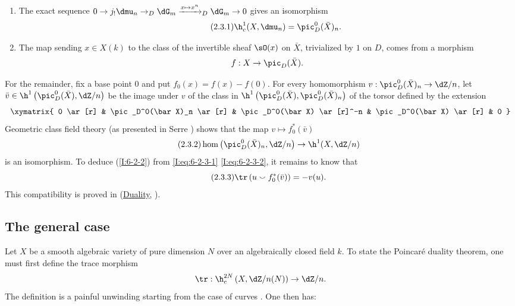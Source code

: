 \begin{enumerate}[\indent a)]
  \item {}The exact sequence
    $0\to j_!\dmu_n\to_D\dG_m\xrightarrow{x\mapsto x^n}_D\dG_m\to0$ gives an
    isomorphism
    \begin{equation*}\tag{2.3.1}\label{I:eq:6-2-3-1}
      \h_c^1(X,\dmu_n) = \pic_D^0(\bar X)_n \text{.}
    \end{equation*}
  \item The map sending $x\in X(k)$ to the class of the invertible sheaf
    $\sO(x)$ on $\bar X$, trivialized by $1$ on $D$, comes from a
    morphism
    \[
      f:X \to \pic_D(\bar X) \text{.}
    \]
\end{enumerate}
For the remainder, fix a base point $0$ and put
$f_0(x)=f(x)-f(0)$. For every homomorphism
$v:\pic_D^0(\bar X)_n\to\dZ/n$, let
$\bar v\in\h^1\left(\pic_D^0(\bar X),\dZ/n\right)$ be the image under
$v$ of the class in
$\h^1\left(\pic_D^0(\bar X),\pic_D^0(\bar X)_n\right)$ of the torsor
defined by the extension
\[\xymatrix{
  0 \ar[r]
    & \pic_D^0(\bar X)_n \ar[r]
    & \pic_D^0(\bar X) \ar[r]^-n
    & \pic_D^0(\bar X) \ar[r]
    & 0
}\]
Geometric class field theory (as presented in Serre \cite{se59}) shows
that the map $v\mapsto f_0^*(\bar v)$
\begin{equation*}\tag{2.3.2}\label{I:eq:6-2-3-2}
  \hom\left(\pic_D^0(\bar X)_n,\dZ/n\right) \to \h^1(X,\dZ/n)
\end{equation*}
is an isomorphism. To deduce (\ref{I:6-2-2}) from
\eqref{I:eq:6-2-3-1} \eqref{I:eq:6-2-3-2}, it remains to know that
\begin{equation*}\tag{2.3.3}\label{I:eq:6-2-3-3}
  \tr\left(u \smallsmile f_0^*(\bar v)\right) = -v(u) \text{.} \end{equation*}
This compatibility is proved in (\hyperref[V]{Duality}, ).


\subsection{The general case}\label{I:6-3}

Let $X$ be a smooth algebraic variety of pure dimension $N$ over an
algebraically closed field $k$. To state the Poincaré duality theorem,
one must first define the trace morphism
\[
  \tr : \h_c^{2N}\left(X,\dZ/n(N)\right) \to \dZ/n\text{.}
\]
The definition is a painful unwinding starting from the case of curves
\cite[XVIII \S 2]{sga4}. One then has:

